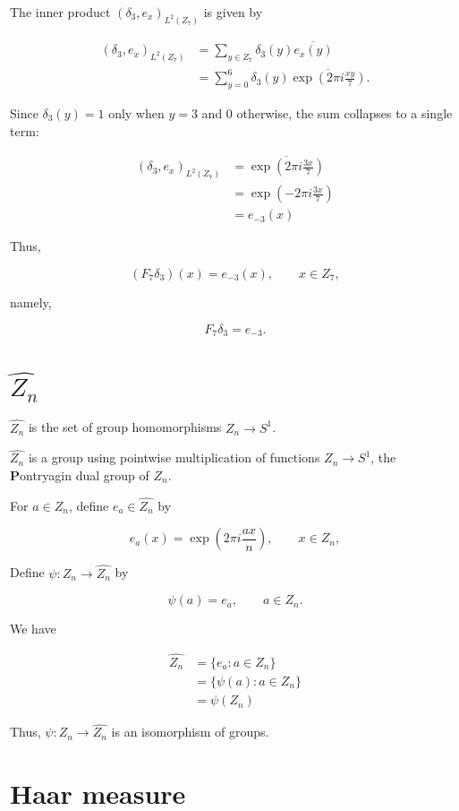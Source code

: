 \documentclass[11pt]{article} %
\begin{document}
The inner product $(\delta_3,e_x)_{L^2(Z_7)}$ is given by

\begin{align*}
(\delta_3,e_x)_{L^2(Z_7)} &= \sum_{y \in Z_7} \delta_3(y) \overline{e_x(y)}\\
&= \sum_{y=0}^{6} \delta_3(y) \overline{\exp\left(2\pi i \frac{xy}{7}\right)}.
\end{align*}

Since $\delta_3(y) = 1$ only when $y = 3$ and $0$ otherwise, the sum collapses to a single term:

\begin{align*}
(\delta_3,e_x)_{L^2(Z_7)} &= \overline{\exp\left(2\pi i \frac{3x}{7}\right)}\\
&= \exp\left(-2\pi i \frac{3x}{7}\right)\\
&= e_{-3}(x)
\end{align*}

Thus,

$$
(F_7 \delta_3)(x) = e_{-3}(x), \qquad x \in Z_7,
$$

namely,

$$
F_7 \delta_3 = e_{-3}.
$$

\section{$\widehat{Z_n}$}

$\widehat{Z_n}$ is the set of group homomorphisms $Z_n \to S^1$.

$\widehat{Z_n}$ is a group using pointwise multiplication of functions $Z_n \to S^1$, the {\textbf Pontryagin dual group} of $Z_n$.

For $a \in Z_n$, define $e_a \in \widehat{Z_n}$  by

$$
e_a(x) = \exp\left(2\pi i \dfrac{ax}{n}\right), \qquad x \in Z_n,
$$

Define $\psi:Z_n \to \widehat{Z_n}$ by

$$\psi(a)=e_a, \qquad a\in Z_n.$$

We have

\begin{align*}
\widehat{Z_n} &= \{e_a : a \in Z_n\}\\
&= \{\psi(a): a \in Z_n\}\\
&= \psi(Z_n)
\end{align*}

Thus, $\psi:Z_n \to \widehat{Z_n}$ is an isomorphism of groups.

\section{Haar measure}
\end{document}
